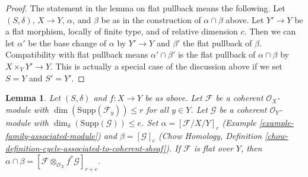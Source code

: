 \documentclass{stacks-project}
\theoremstyle{plain}
\newtheorem{lemma}[subsection]{Lemma}
\theoremstyle{definition}
\theoremstyle{remark}
\numberwithin{equation}{subsection}
\begin{document}
\begin{proof}
\medskip\noindent
The statement in the lemma on flat pullback means the following.
Let $(S, \delta)$, $X \to Y$, $\alpha$, and $\beta$ be as in the
construction of $\alpha \cap \beta$ above. Let $Y' \to Y$ be a flat
morphism, locally of finite type, and of relative dimension $c$. Then
we can let $\alpha'$ be the base change of $\alpha$ by $Y' \to Y$
and $\beta'$ the flat pullback of $\beta$. Compatibility with flat
pullback means $\alpha' \cap \beta'$ is the flat pullback of
$\alpha \cap \beta$ by $X \times_Y Y' \to Y$. This is actually
a special case of the discussion above if we set $S = Y$ and $S' = Y'$.
\end{proof}

\begin{lemma}
\label{lemma-action-coherent}
Let $(S, \delta)$ and $f : X \to Y$ be as above.
Let $\mathcal{F}$ be a coherent $\mathcal{O}_X$-module
with $\dim(\text{Supp}(\mathcal{F}_y)) \leq r$ for all $y \in Y$.
Let $\mathcal{G}$ be a coherent $\mathcal{O}_Y$-module
with $\dim_\delta(\text{Supp}(\mathcal{G})) \leq e$.
Set $\alpha = [\mathcal{F}/X/Y]_r$
(Example \ref{example-family-associated-module}) and
$\beta = [\mathcal{G}]_e$ (Chow Homology, Definition
\ref{chow-definition-cycle-associated-to-coherent-sheaf}).
If $\mathcal{F}$ is flat over $Y$, then $\alpha \cap \beta =
[\mathcal{F} \otimes_{\mathcal{O}_X} f^*\mathcal{G}]_{r + e}$.
\end{lemma}
\end{document}
